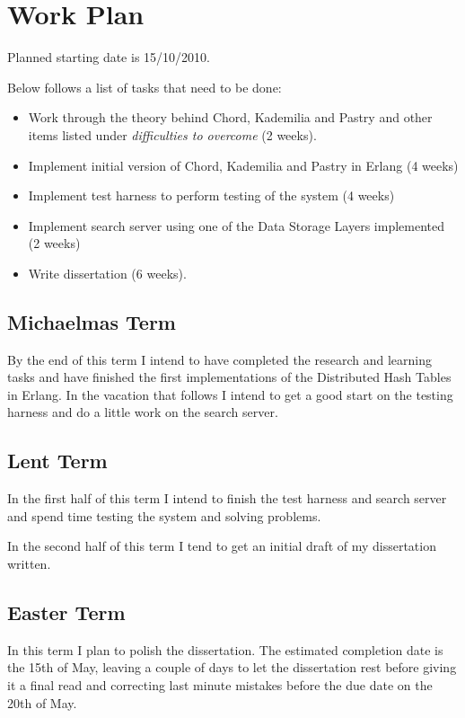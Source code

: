 \section*{Work Plan}

Planned starting date is 15/10/2010. 

Below follows a list of tasks that need to be done:

\begin{itemize}
  \item Work through the theory behind Chord, Kademilia and Pastry and other items listed under \emph{difficulties to overcome} (2 weeks).
  \item Implement initial version of Chord, Kademilia and Pastry in Erlang (4 weeks)
  \item Implement test harness to perform testing of the system (4 weeks)
  \item Implement search server using one of the Data Storage Layers implemented (2 weeks)
  \item Write dissertation (6 weeks).
\end{itemize}

\subsection*{Michaelmas Term} 

By the end of this term I intend to have completed the research and learning tasks and have finished the first implementations of the Distributed Hash Tables in Erlang. In the vacation that follows I intend to get a good start on the testing harness and do a little work on the search server.


\subsection*{Lent Term}

In the first half of this term I intend to finish the test harness and search server and spend time testing the system and solving problems.

In the second half of this term I tend to get an initial draft of my dissertation written.


\subsection*{Easter Term}

In this term I plan to polish the dissertation. The estimated completion date is the 15th of May, leaving a couple of days to let the dissertation rest before giving it a final read and correcting last minute mistakes before the due date on the 20th of May.

